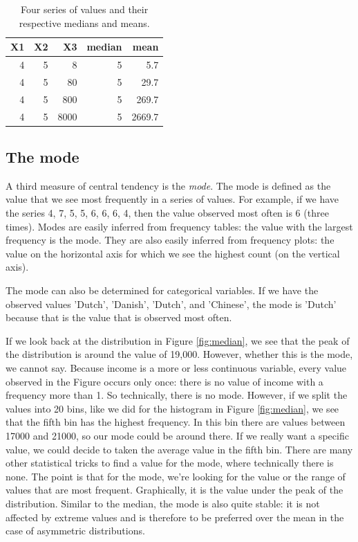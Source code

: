 \documentclass[]{book}\usepackage[]{graphicx}\usepackage[]{color}
\begin{document}
\begin{table}[ht]
\centering
\caption{Four series of values and their respective medians and means.} 
\label{tab:median_2}
\begin{tabular}{rrrrr}
  \hline
X1 & X2 & X3 & median & mean \\ 
  \hline
4 & 5 & 8 & 5 & 5.7 \\ 
  4 & 5 & 80 & 5 & 29.7 \\ 
  4 & 5 & 800 & 5 & 269.7 \\ 
  4 & 5 & 8000 & 5 & 2669.7 \\ 
   \hline
\end{tabular}
\end{table}




\subsection{The mode}
A third measure of central tendency is the \textit{mode}. The mode is defined as the value that we see most frequently in a series of values. For example, if we have the series 4, 7, 5, 5, 6, 6, 6, 4, then the value observed most often is 6 (three times). Modes are easily inferred from frequency tables: the value with the largest frequency is the mode. They are also easily inferred from frequency plots: the value on the horizontal axis for which we see the highest count (on the vertical axis).

The mode can also be determined for categorical variables. If we have the observed values  'Dutch', 'Danish', 'Dutch', and 'Chinese', the mode is 'Dutch' because that is the value that is observed most often.

If we look back at the distribution in Figure \ref{fig:median}, we see that the peak of the distribution is around the value of 19,000. However, whether this is the mode, we cannot say. Because income is a more or less continuous variable, every value observed in the Figure occurs only once: there is no value of income with a frequency more than 1. So technically, there is no mode. However, if we split the values into 20 bins, like we did for the histogram in Figure \ref{fig:median}, we see that the fifth bin has the highest frequency. In this bin there are values between 17000 and 21000, so our mode could be around there. If we really want a specific value, we could decide to taken the average value in the fifth bin. There are many other statistical tricks to find a value for the mode, where technically there is none. The point is that for the mode, we're looking for the value or the range of values that are most frequent. Graphically, it is the value under the peak of the distribution. Similar to the median, the mode is also quite stable: it is not affected by extreme values and is therefore to be preferred over the mean in the case of asymmetric distributions.
\end{document}
